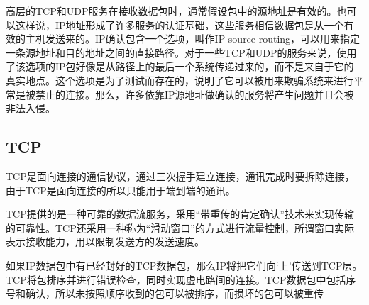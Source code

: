 高{\cf}层的{\cf}TC{\cf}P和{\cf}UD{\cf}P服{\cf}务在{\cf}接收{\cf}数据{\cf}包时{\cf}，通{\cf}常假{\cf}设包{\cf}中的{\cf}源地{\cf}址是{\cf}有效{\cf}的。{\cf}也可{\cf}以这{\cf}样说{\cf}，I{\cf}P地{\cf}址形{\cf}成了{\cf}许多{\cf}服务{\cf}的认{\cf}证基{\cf}础，{\cf}这些{\cf}服务{\cf}相信{\cf}数据{\cf}包是{\cf}从一{\cf}个有{\cf}效的{\cf}主机{\cf}发送{\cf}来的{\cf}。I{\cf}P确{\cf}认包{\cf}含一{\cf}个选{\cf}项，{\cf}叫作{\cf}IP{\cf} s{\cf}ou{\cf}rc{\cf}e {\cf}ro{\cf}ut{\cf}in{\cf}g，{\cf}可以{\cf}用来{\cf}指定{\cf}一条{\cf}源地{\cf}址和{\cf}目的{\cf}地址{\cf}之间{\cf}的直{\cf}接路{\cf}径。{\cf}对于{\cf}一些{\cf}TC{\cf}P和{\cf}UD{\cf}P的{\cf}服务{\cf}来说{\cf}，使{\cf}用了{\cf}该选{\cf}项的{\cf}IP{\cf}包好{\cf}像是{\cf}从路{\cf}径上{\cf}的最{\cf}后一{\cf}个系{\cf}统传{\cf}递过{\cf}来的{\cf}，而{\cf}不是{\cf}来自{\cf}于它{\cf}的真{\cf}实地{\cf}点。{\cf}这个{\cf}选项{\cf}是为{\cf}了测{\cf}试而{\cf}存在{\cf}的，{\cf}说明{\cf}了它{\cf}可以{\cf}被用{\cf}来欺{\cf}骗系{\cf}统来{\cf}进行{\cf}平常{\cf}是被{\cf}禁止{\cf}的连{\cf}接。{\cf}那么{\cf}，许{\cf}多依{\cf}靠I{\cf}P源{\cf}地址{\cf}做确{\cf}认的{\cf}服务{\cf}将产{\cf}生问{\cf}题并{\cf}且会{\cf}被非{\cf}法入{\cf}侵。

\subsection{TCP}
TCP{\cf}是面{\cf}向连{\cf}接的{\cf}通信{\cf}协议{\cf}，通{\cf}过三{\cf}次握{\cf}手建{\cf}立连{\cf}接，{\cf}通讯{\cf}完成{\cf}时要{\cf}拆除{\cf}连接{\cf}，由{\cf}于T{\cf}CP{\cf}是面{\cf}向连{\cf}接的{\cf}所以{\cf}只能{\cf}用于{\cf}端到{\cf}端的{\cf}通讯。

TCP{\cf}提供{\cf}的是{\cf}一种{\cf}可靠{\cf}的数{\cf}据流{\cf}服务{\cf}，采{\cf}用“{\cf}带重{\cf}传的{\cf}肯定{\cf}确认{\cf}”技{\cf}术来{\cf}实现{\cf}传输{\cf}的可{\cf}靠性{\cf}。T{\cf}CP{\cf}还采{\cf}用一{\cf}种称{\cf}为“{\cf}滑动{\cf}窗口{\cf}”的{\cf}方式{\cf}进行{\cf}流量{\cf}控制{\cf}，所{\cf}谓窗{\cf}口实{\cf}际表{\cf}示接{\cf}收能{\cf}力，{\cf}用以{\cf}限制{\cf}发送{\cf}方的{\cf}发送速度。

如{\cf}果I{\cf}P数{\cf}据包{\cf}中有{\cf}已经{\cf}封好{\cf}的T{\cf}CP{\cf}数据{\cf}包，{\cf}那么{\cf}IP{\cf}将把{\cf}它们{\cf}向‘{\cf}上’{\cf}传送{\cf}到T{\cf}CP{\cf}层。{\cf}TC{\cf}P将{\cf}包排{\cf}序并{\cf}进行{\cf}错误{\cf}检查{\cf}，同{\cf}时实{\cf}现虚{\cf}电路{\cf}间的{\cf}连接{\cf}。T{\cf}CP{\cf}数据{\cf}包中{\cf}包括{\cf}序号{\cf}和确{\cf}认，{\cf}所以{\cf}未按{\cf}照顺{\cf}序收{\cf}到的{\cf}包可{\cf}以被{\cf}排序{\cf}，而{\cf}损坏{\cf}的包{\cf}可以{\cf}被重传

